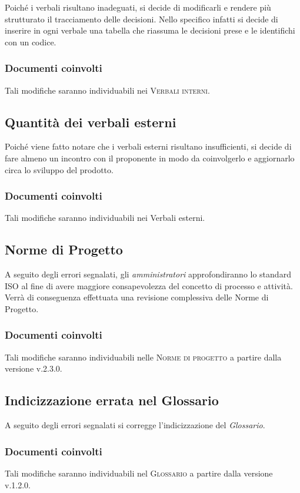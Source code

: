 \documentclass{article}
\begin{document}
Poiché i verbali risultano inadeguati, si decide di modificarli e rendere più strutturato il tracciamento delle decisioni. Nello specifico infatti si decide di inserire
in ogni verbale una tabella che riassuma le decisioni prese e le identifichi con un codice. 
\subsubsection*{Documenti coinvolti}
Tali modifiche saranno individuabili nei \textsc{Verbali interni}. 

\subsection{Quantità dei verbali esterni}
\label{itm:6}

Poiché viene fatto notare che i verbali esterni risultano insufficienti, si decide di fare almeno un incontro con il proponente in modo da coinvolgerlo e aggiornarlo circa lo sviluppo del prodotto.
\subsubsection*{Documenti coinvolti}
Tali modifiche saranno individuabili nei Verbali esterni.

\subsection{Norme di Progetto}
\label{itm:7}

A seguito degli errori segnalati, gli \emph{amministratori} approfondiranno lo standard ISO al fine di avere maggiore consapevolezza del concetto di processo e attività. Verrà di conseguenza
effettuata una revisione complessiva delle Norme di Progetto.
\subsubsection*{Documenti coinvolti}
Tali modifiche saranno individuabili nelle \textsc{Norme di progetto} a partire dalla versione v.2.3.0.

\subsection{Indicizzazione errata nel Glossario}
\label{itm:7}

A seguito degli errori segnalati si corregge l'indicizzazione del \emph{Glossario}.
\subsubsection*{Documenti coinvolti}
Tali modifiche saranno individuabili nel \textsc{Glossario} a partire dalla versione v.1.2.0.
\end{document}
